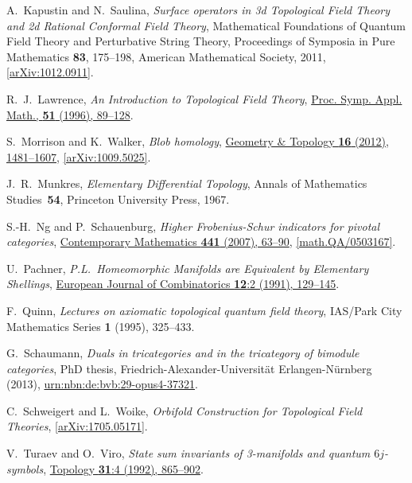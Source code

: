 \documentclass[12pt]{scrartcl}
\newcommand\doi[2]        {\href{http://dx.doi.org/#1}{#2}}
\theoremstyle{definition}
\numberwithin{equation}{section}
\numberwithin{definition}{section}
\numberwithin{figure}{section}
\begin{document}
\begin{thebibliography}{BDSPV}
A.~Kapustin and N.~Saulina, 
\textsl{Surface operators in 3d Topological Field Theory and 2d Rational Conformal Field Theory}, 
Mathematical Foundations of Quantum Field Theory and Perturbative String Theory, 
Proceedings of Symposia in Pure Mathematics \textbf{83}, 175--198, 
American Mathematical Society, 2011, 
\href{http://arxiv.org/abs/1012.0911}{[arXiv:1012.0911]}.

R.~J.~Lawrence, 
\textsl{An Introduction to Topological Field Theory}, 
\doi{10.1090/psapm/051}{Proc. Symp. Appl. Math., \textbf{51} (1996), 89--128}. 

S.~Morrison and K.~Walker, 
\textsl{Blob homology}, 
\doi{10.2140/gt.2012.16.1481}{Geometry \& Topology \textbf{16} (2012), 1481--1607}, 
\href{http://arxiv.org/abs/1009.5025}{[arXiv:1009.5025]}.  

J.~R.~Munkres, 
\textsl{Elementary Differential Topology}, 
Annals of Mathematics Studies~\textbf{54}, 
Princeton University Press, 
1967.

S.-H.~Ng and P.~Schauenburg, 
\textsl{Higher Frobenius-Schur indicators for pivotal categories}, 
\doi{10.1090/conm/441/08500}{Contemporary Mathematics \textbf{441} (2007), 63--90}, 
\href{http://arxiv.org/abs/math/0503167}{[math.QA/0503167]}.

U.~Pachner, 
\textsl{P.L.~Homeomorphic Manifolds are Equivalent by Elementary Shellings}, 
\doi{10.1016/S0195-6698(13)80080-7}{European Journal of Combinatorics \textbf{12}:2 (1991), 129--145}. 

F.~Quinn, 
\textsl{Lectures on axiomatic topological quantum field theory}, 
IAS/Park City Mathematics Series \textbf{1} (1995), 325--433.

G.~Schaumann, 
\textsl{Duals in tricategories and in the tricategory of bimodule categories}, 
PhD thesis, 
Friedrich-Alexander-Universit\"at Erlangen-N\"urnberg (2013), 
\href{http://nbn-resolving.de/urn/resolver.pl?urn:nbn:de:bvb:29-opus4-37321}{urn:nbn:de:bvb:29-opus4-37321}.

C.~Schweigert and L.~Woike,
\textsl{Orbifold Construction for Topological Field Theories}, 
\href{http://arxiv.org/abs/1705.05171}{[arXiv:1705.05171]}.

V.~Turaev and O.~Viro, 
\textsl{State sum invariants of 3-manifolds and quantum $6j$-symbols}, 
\doi{10.1016/0040-9383(92)90015-A}{Topology \textbf{31}:4 (1992), 865--902}.

\end{thebibliography}
\end{document}
